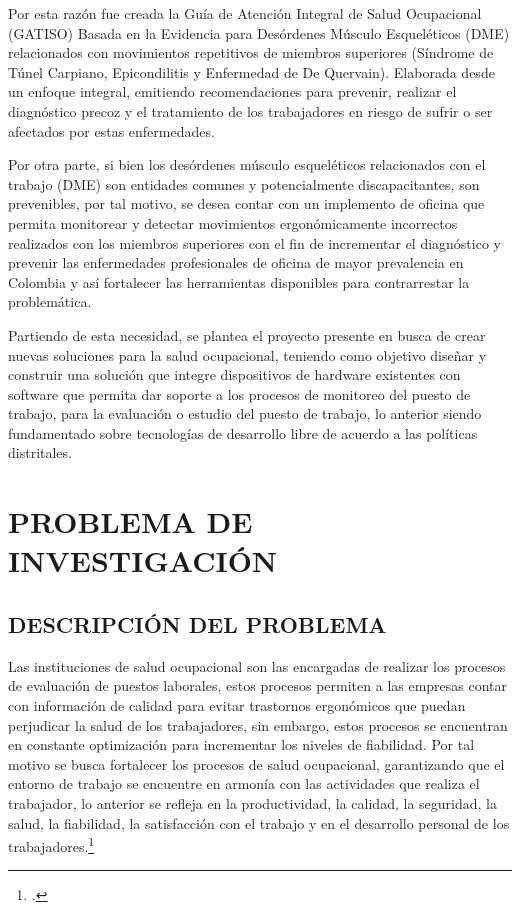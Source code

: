 Por esta razón fue creada la Guía de Atención Integral de Salud Ocupacional (GATISO) Basada en la Evidencia para Desórdenes Músculo Esqueléticos (DME) relacionados con movimientos repetitivos de miembros superiores (Síndrome de Túnel Carpiano, Epicondilitis y Enfermedad de De Quervain). Elaborada desde un enfoque integral, emitiendo recomendaciones para prevenir, realizar el diagnóstico precoz y el tratamiento de los trabajadores en riesgo de sufrir o ser afectados por estas enfermedades.

Por otra parte, si bien los desórdenes músculo esqueléticos relacionados con el trabajo (DME) son entidades comunes y potencialmente discapacitantes, son prevenibles, por tal motivo, se desea contar con un implemento de oficina que permita monitorear y detectar movimientos ergonómicamente incorrectos realizados con los miembros superiores con el fin de incrementar el diagnóstico y prevenir las enfermedades profesionales de oficina de mayor prevalencia en Colombia y así fortalecer las herramientas disponibles para contrarrestar la problemática.

Partiendo de esta necesidad, se plantea el proyecto presente en busca de crear nuevas soluciones para la salud ocupacional, teniendo como objetivo diseñar y construir una solución que integre dispositivos de hardware existentes con software que permita dar soporte a los procesos de monitoreo del puesto de trabajo, para la evaluación o estudio del puesto de trabajo, lo anterior siendo fundamentado sobre tecnologías de desarrollo libre de acuerdo a las políticas distritales.

\chapter{PROBLEMA DE INVESTIGACIÓN}
\section{DESCRIPCIÓN DEL PROBLEMA}
Las instituciones de salud ocupacional son las encargadas de realizar los procesos de evaluación de puestos laborales, estos procesos permiten a las empresas contar con información de calidad para evitar trastornos ergonómicos que puedan perjudicar la salud de los trabajadores, sin embargo, estos procesos se encuentran en constante optimización para incrementar los niveles de fiabilidad. Por tal motivo se busca fortalecer los procesos de salud ocupacional, garantizando que el entorno de trabajo se encuentre en armonía con las actividades que realiza el trabajador, lo anterior se refleja en la productividad, la calidad, la seguridad, la salud, la fiabilidad, la satisfacción con el trabajo y en el desarrollo personal de los trabajadores.\footcite[3]{MiguelAGonzalezPerez}


